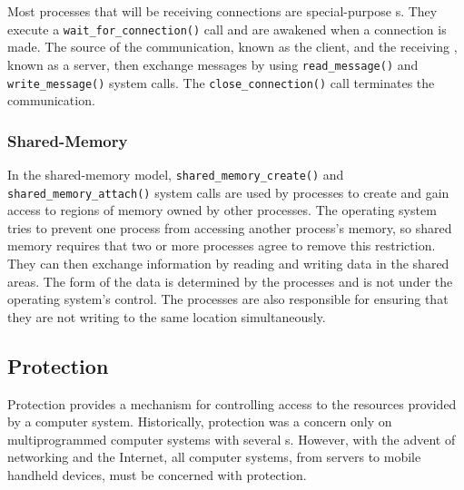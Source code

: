 Most processes that will be receiving connections are special-purpose s.
They execute a \texttt{wait_for_connection()} call and are awakened when a connection is made.
The source of the communication, known as the client, and the receiving , known as a server, then exchange messages by using \texttt{read_message()} and \texttt{write_message()} system calls.
The \texttt{close_connection()} call terminates the communication.

\subsubsection{Shared-Memory}\label{subsubsec:Shared_Memory}
In the shared-memory model, \texttt{shared_memory_create()} and \texttt{shared_memory_attach()} system calls are used by processes to create and gain access to regions of memory owned by other processes.
The operating system tries to prevent one process from accessing another process’s memory, so shared memory requires that two or more processes agree to remove this restriction.
They can then exchange information by reading and writing data in the shared areas.
The form of the data is determined by the processes and is not under the operating system’s control.
The processes are also responsible for ensuring that they are not writing to the same location simultaneously.

\subsection{Protection}\label{subsec:Protection}
Protection provides a mechanism for controlling access to the resources provided by a computer system.
Historically, protection was a concern only on multiprogrammed computer systems with several s.
However, with the advent of networking and the Internet, all computer systems, from servers to mobile handheld devices, must be concerned with protection.

